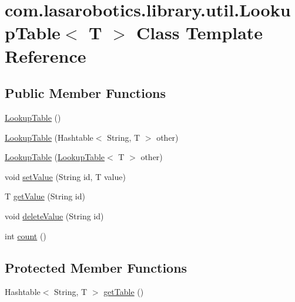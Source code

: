 \hypertarget{classcom_1_1lasarobotics_1_1library_1_1util_1_1_lookup_table}{}\section{com.\+lasarobotics.\+library.\+util.\+Lookup\+Table$<$ T $>$ Class Template Reference}
\label{classcom_1_1lasarobotics_1_1library_1_1util_1_1_lookup_table}
\subsection*{Public Member Functions}
\begin{DoxyCompactItemize}
\item 
\hyperlink{classcom_1_1lasarobotics_1_1library_1_1util_1_1_lookup_table_acc7f40d76adc0c9ef5af49cf44af7929}{Lookup\+Table} ()
\item 
\hyperlink{classcom_1_1lasarobotics_1_1library_1_1util_1_1_lookup_table_af95827a058b619d3f98324fae15cb24c}{Lookup\+Table} (Hashtable$<$ String, T $>$ other)
\item 
\hyperlink{classcom_1_1lasarobotics_1_1library_1_1util_1_1_lookup_table_a01db510c04a8a9c299e5958285f4cac0}{Lookup\+Table} (\hyperlink{classcom_1_1lasarobotics_1_1library_1_1util_1_1_lookup_table}{Lookup\+Table}$<$ T $>$ other)
\item 
void \hyperlink{classcom_1_1lasarobotics_1_1library_1_1util_1_1_lookup_table_a1ace1666dc3340fe969e0161031094db}{set\+Value} (String id, T value)
\item 
T \hyperlink{classcom_1_1lasarobotics_1_1library_1_1util_1_1_lookup_table_a468df4f143f2103485ddda43ecdc98fc}{get\+Value} (String id)
\item 
void \hyperlink{classcom_1_1lasarobotics_1_1library_1_1util_1_1_lookup_table_aa9a47eda22918f48045fd0e9ef49eedb}{delete\+Value} (String id)
\item 
int \hyperlink{classcom_1_1lasarobotics_1_1library_1_1util_1_1_lookup_table_a9be202b6492a8acb988d23d829de76cb}{count} ()
\end{DoxyCompactItemize}
\subsection*{Protected Member Functions}
\begin{DoxyCompactItemize}
\item 
Hashtable$<$ String, T $>$ \hyperlink{classcom_1_1lasarobotics_1_1library_1_1util_1_1_lookup_table_a6355cca75e147643b09a7a3c9898eca7}{get\+Table} ()
\end{DoxyCompactItemize}


